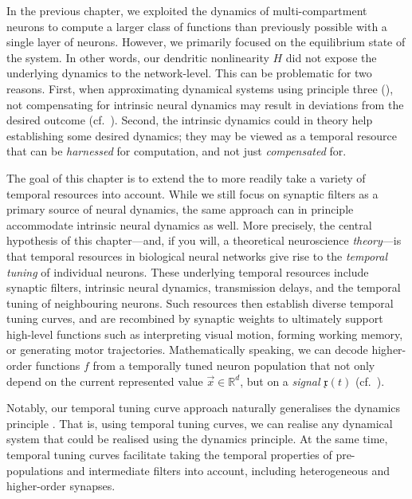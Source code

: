 
In the previous chapter, we exploited the dynamics of multi-compartment \nlif neurons to compute a larger class of functions than previously possible with a single layer of \LIF neurons.
However, we primarily focused on the equilibrium state of the \nlif system.
In other words, our dendritic nonlinearity $H$ did not expose the underlying dynamics to the network-level.
This can be problematic for two reasons.
First, when approximating dynamical systems using \NEF principle three (), not compensating for intrinsic neural dynamics may result in deviations from the desired outcome (cf.~).
Second, the intrinsic dynamics could in theory help establishing some desired dynamics; they may be viewed as a temporal resource that can be \emph{harnessed} for computation, and not just \emph{compensated} for.

The goal of this chapter is to extend the \NEF to more readily take a variety of temporal resources into account.
While we still focus on synaptic filters as a primary source of neural dynamics, the same approach can in principle accommodate intrinsic neural dynamics as well.
More precisely, the central hypothesis of this chapter---and, if you will, a theoretical neuroscience \emph{theory}---is that temporal resources in biological neural networks give rise to the \emph{temporal tuning} of individual neurons.
These underlying temporal resources include synaptic filters, intrinsic neural dynamics, transmission delays, and the temporal tuning of neighbouring neurons.
Such resources then establish diverse temporal tuning curves, and are recombined by synaptic weights to ultimately support high-level functions such as interpreting visual motion, forming working memory, or generating motor trajectories.
Mathematically speaking, we can decode higher-order functions $f$ from a temporally tuned neuron population that not only depend on the current represented value $\vec x \in \mathbb{R}^d$, but on a \emph{signal} $\mathfrak{x}(t)$ (cf.~).

Notably, our temporal tuning curve approach naturally generalises the \NEF dynamics principle \citep[Chapter~8]{eliasmith2003neural}.
That is, using temporal tuning curves, we can realise any dynamical system that could be realised using the dynamics principle.
At the same time, temporal tuning curves facilitate taking the temporal properties of pre-populations and intermediate filters into account, including heterogeneous and higher-order synapses.

